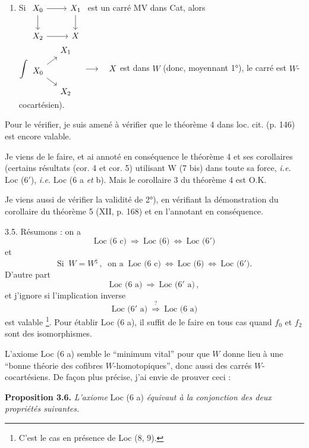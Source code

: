\documentclass[11pt]{article}
\newcommand{\printedpage}[1]{\marginpar{\footnotesize p.~#1}}
\newcommand{\msp}[1]{\marginpar{\footnotesize [#1]}}
\begin{document}
\begin{enumerate}
\item[1° bis)] Si
$\begin{tikzcd}[ampersand replacement=\&, baseline=(\tikzcdmatrixname-1-1.base)]
X_0 \arrow[r] \arrow[d] \& X_1 \arrow[d] \\
X_2 \arrow[r] \& X
\end{tikzcd}$
est un carré MV dans Cat, alors
$\displaystyle\int
\begin{tikzcd}[ampersand replacement=\&, row sep=small, column sep=small]
\& X_1 \\
X_0 \arrow[ur] \arrow[dr] \& \\
\& X_2
\end{tikzcd}
\quad \longrightarrow \quad X$ est dans $W$ (donc, moyennant 1°), le carré est $W$-cocartésien).
\end{enumerate}

\printedpage{17}
Pour le vérifier, je suis amené à vérifier que le théorème 4 dans loc. cit. (p. 146) est encore valable.

Je viens de le faire, et ai annoté en conséquence le théorème 4 et ses corollaires (certains résultats (cor. 4 et cor. 5) utilisant W (7 bis) dans toute sa force, \textit{i.e.} Loc (6$'$), \textit{i.e.} Loc (6 a \textit{et} b). Mais le corollaire 3 du théorème 4 est O.K.

Je viens aussi de vérifier la validité de 2°), en vérifiant la démonstration du corollaire du théorème 5 (XII, p. 168) et en l'annotant en conséquence.

\msp{page 25}3.5. Résumons : on a
\[
\text{Loc (6 c)} \ \Longrightarrow \ \text{Loc (6)} \ \iff \ \text{Loc (6$'$)}
\tag*{(3.5.1)}
\]
et
\[
\text{Si } \ W = W^{\natural}\,, \ \text{ on a } \ \text{Loc (6 c)} \ \iff \ \text{Loc (6)} \ \iff \ \text{Loc (6$'$)}.
\tag*{(3.5.2)}
\]
D'autre part
\[
\text{Loc (6 a)} \ \Longrightarrow \ \text{Loc (6$'$ a)}\,,
\tag*{(3.5.3)}
\]
et j'ignore si l'implication inverse
\[
\text{Loc (6$'$ a)} \ \overset{?}{\Longrightarrow} \ \text{Loc (6 a)}
\]
est valable \footnote[18]{C'est le cas en présence de Loc (8, 9).}. Pour établir Loc (6 a), il suffit de le faire en tous cas quand $f_0$ et $f_2$ sont des isomorphismes.

L'axiome Loc (6 a) semble le “minimum vital” pour que $W$ donne lieu à une “bonne théorie des cofibres $W$-homotopiques”, donc aussi des carrés $W$-cocartésiens. De façon plus précise, j'ai envie de prouver ceci :

\textbf{Proposition 3.6.} \textit{L'axiome} Loc (6 a) \textit{équivaut à la conjonction des deux propriétés suivantes.}
\end{document}
